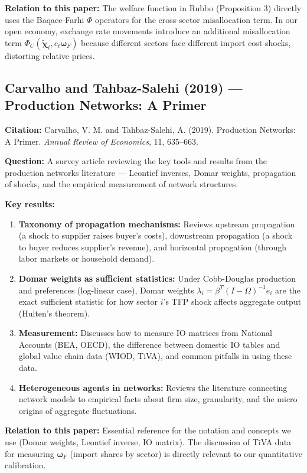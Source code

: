 \documentclass[12pt]{article}
\begin{document}
\textbf{Relation to this paper:} The welfare function in Rubbo (Proposition 3) directly uses the Baqaee-Farhi $\Phi$ operators for the cross-sector misallocation term. In our open economy, exchange rate movements introduce an additional misallocation term $\Phi_C(\tilde{\bm{\chi}}_t, e_t\bm{\omega}_F)$ because different sectors face different import cost shocks, distorting relative prices.

\subsection{Carvalho and Tahbaz-Salehi (2019) --- Production Networks: A Primer}

\textbf{Citation:} Carvalho, V. M. and Tahbaz-Salehi, A. (2019). Production Networks: A Primer. \textit{Annual Review of Economics}, 11, 635--663.

\textbf{Question:} A survey article reviewing the key tools and results from the production networks literature --- Leontief inverses, Domar weights, propagation of shocks, and the empirical measurement of network structures.

\textbf{Key results:}
\begin{enumerate}
    \item \textbf{Taxonomy of propagation mechanisms:} Reviews upstream propagation (a shock to supplier raises buyer's costs), downstream propagation (a shock to buyer reduces supplier's revenue), and horizontal propagation (through labor markets or household demand).
    \item \textbf{Domar weights as sufficient statistics:} Under Cobb-Douglas production and preferences (log-linear case), Domar weights $\lambda_i = \beta^T(I-\Omega)^{-1}e_i$ are the exact sufficient statistic for how sector $i$'s TFP shock affects aggregate output (Hulten's theorem).
    \item \textbf{Measurement:} Discusses how to measure IO matrices from National Accounts (BEA, OECD), the difference between domestic IO tables and global value chain data (WIOD, TiVA), and common pitfalls in using these data.
    \item \textbf{Heterogeneous agents in networks:} Reviews the literature connecting network models to empirical facts about firm size, granularity, and the micro origins of aggregate fluctuations.
\end{enumerate}

\textbf{Relation to this paper:} Essential reference for the notation and concepts we use (Domar weights, Leontief inverse, IO matrix). The discussion of TiVA data for measuring $\bm{\omega}_F$ (import shares by sector) is directly relevant to our quantitative calibration.
\end{document}
